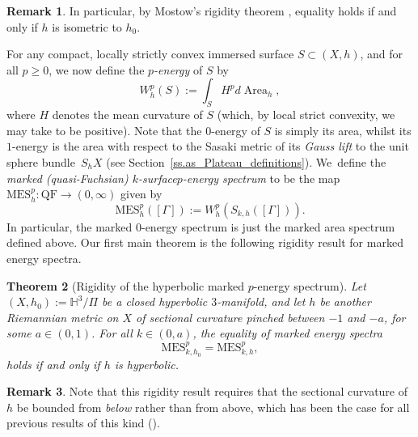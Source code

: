 \documentclass[JEP,XML,SOM,Unicode,NoEqCountersInSection,published]{cedram}
\newcommand{\ksurface}{$k$\nobreakdash-surface\xspace}
\theoremstyle{plain}
\newtheorem{theorem}{Theorem}[section]
\theoremstyle{definition}
\newtheorem{remark}[theorem]{Remark}
\newcommand\Hyp{\mathbb{H}^3}
\let\dans\subset
\newcommand{\QF}{\mathrm{QF}}
\DeclareMathOperator{\Area}{Area}
\begin{document}
\begin{remark} In particular, by Mostow's rigidity theorem \cite{Mostow}, equality holds if and only if $h$ is isometric to $h_0$.
\end{remark}

For any compact, locally strictly convex immersed surface $S\dans (X,h)$, and for all $p\geq 0$, we now define the \emph{$p$-energy} of $S$ by
\begin{equation}\label{eq.energy}
W^p_h(S):=\int_SH^pd\Area_h,
\end{equation}
where $H$ denotes the mean curvature of $S$ (which, by local strict convexity, we may take to be positive). Note that the $0$-energy of $S$ is simply its area, whilst its $1$-energy is the area with respect to the Sasaki metric of its \emph{Gauss lift} to the unit sphere bundle~$S_hX$ (see Section~\ref{ss.as_Plateau_definitions}). We~define the \emph{marked (quasi-Fuchsian) \ksurface $p$-energy spectrum} to be the map $\text{MES}_h^p:\QF\to(0,\infty)$ given by
\begin{equation}\label{eq.MarkedEnergySpectrum}
\text{MES}_h^p([\Gamma]) := W^p_h(S_{k,h}([\Gamma])).
\end{equation}
In particular, the marked $0$-energy spectrum is just the marked area spectrum defined above. Our first main theorem is the following rigidity result for marked energy spectra.

\begin{theorem}[Rigidity of the hyperbolic marked $p$-energy spectrum]\label{thm.Rigidity_hyp_energy_spectrum}
Let $(X,h_0):=\Hyp/\Pi$ be a closed hyperbolic $3$\nobreakdash-manifold, and let $h$ be another Riemannian metric on $X$ of sectional curvature pinched between $-1$ and $-a$, for some $a\in(0,1)$. For all $k\in(0,a)$, the equality of marked energy spectra
\begin{equation}\label{eqn.rigidity_energy}
\mathrm{MES}^p_{k,h_0}=\mathrm{MES}^p_{k,h},
\end{equation}
holds if and only if $h$ is hyperbolic.
\end{theorem}

\begin{remark}
Note that this rigidity result requires that the sectional curvature of~$h$ be bounded from \emph{below} rather than from above, which has been the case for all previous results of this kind (\cf \cite{ALS,CMN}).
\end{remark}
\end{document}
